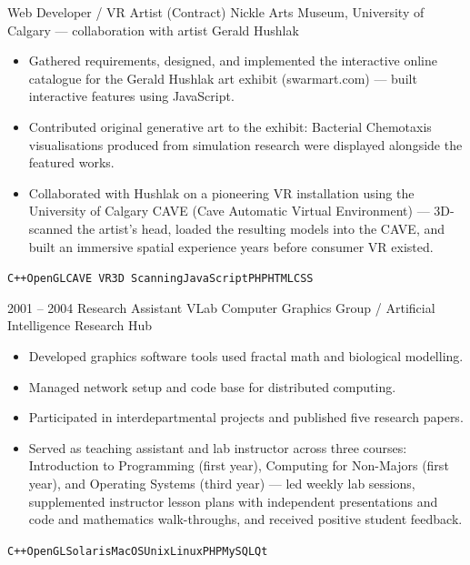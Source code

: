 \documentclass[9pt]{developercv}
\begin{document}
\begin{entrylist}
		{Web Developer / VR Artist (Contract)}
		{Nickle Arts Museum, University of Calgary --- collaboration with artist Gerald Hushlak}
		{\begin{itemize}[noitemsep,topsep=2pt,leftmargin=1em,parsep=0pt]
			  \item Gathered requirements, designed, and implemented the interactive online catalogue for the Gerald Hushlak art exhibit (swarmart.com) --- built interactive features using JavaScript.
			  \item Contributed original generative art to the exhibit: Bacterial Chemotaxis visualisations produced from simulation research were displayed alongside the featured works.
			  \item Collaborated with Hushlak on a pioneering VR installation using the University of Calgary CAVE (Cave Automatic Virtual Environment) --- 3D-scanned the artist's head, loaded the resulting models into the CAVE, and built an immersive spatial experience years before consumer VR existed.
			\end{itemize}
			\texttt{C++}\slashsep\texttt{OpenGL}\slashsep\texttt{CAVE VR}\slashsep\texttt{3D Scanning}\slashsep\texttt{JavaScript}\slashsep\texttt{PHP}\slashsep\texttt{HTML}\slashsep\texttt{CSS}}
	\entry
		{2001 -- 2004}
		{Research Assistant}
		{VLab Computer Graphics Group / Artificial Intelligence Research Hub}
		{\begin{itemize}[noitemsep,topsep=2pt,leftmargin=1em,parsep=0pt]
			  \item Developed graphics software tools used fractal math and biological modelling.
			  \item Managed network setup and code base for distributed computing.
			  \item Participated in interdepartmental projects and published five research papers.
			  \item Served as teaching assistant and lab instructor across three courses: Introduction to Programming (first year), Computing for Non-Majors (first year), and Operating Systems (third year) --- led weekly lab sessions, supplemented instructor lesson plans with independent presentations and code and mathematics walk-throughs, and received positive student feedback.
			\end{itemize}
			\texttt{C++}\slashsep\texttt{OpenGL}\slashsep\texttt{Solaris}\slashsep\texttt{MacOS}\slashsep\texttt{Unix}\slashsep\texttt{Linux}\slashsep\texttt{PHP}\slashsep\texttt{MySQL}\slashsep\texttt{Qt}}
\end{entrylist}
\end{document}
